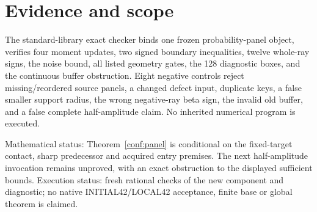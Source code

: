 \documentclass[11pt]{article}
\begin{document}
\section{Evidence and scope}
The standard-library exact checker binds one frozen probability-panel
object, verifies four moment updates, two signed boundary inequalities,
twelve whole-ray signs, the noise bound, all listed geometry gates, the
128 diagnostic boxes, and the continuous buffer obstruction. Eight
negative controls reject missing/reordered source panels, a changed
defect input, duplicate keys, a false smaller support radius, the wrong
negative-ray beta sign, the invalid old buffer, and a false complete
half-amplitude claim. No inherited numerical program is executed.

Mathematical status: Theorem~\ref{conf:panel} is conditional on the
fixed-target contact, sharp predecessor and acquired entry premises.
The next half-amplitude invocation remains unproved, with an exact
obstruction to the displayed sufficient bounds. Execution status:
fresh rational checks of the new component and diagnostic; no native
INITIAL42/LOCAL42 acceptance, finite base or global theorem is claimed.
\end{document}
